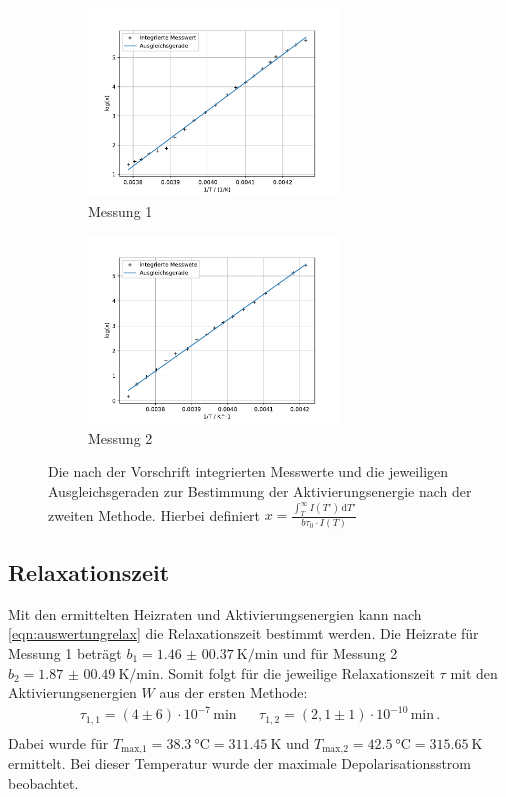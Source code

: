   \begin{figure}[H]
    \begin{subfigure}[b]{.5\linewidth}
      \centering
      \includegraphics[height=5cm, keepaspectratio]{build/log(int)_2durchT_1.pdf}
      \caption{Messung 1}
    \end{subfigure}
    \begin{subfigure}[b]{.5\linewidth}
      \centering
      \includegraphics[height=5cm, keepaspectratio]{build/log(int)_2durchT_2.pdf}
      \caption{Messung 2}
    \end{subfigure}
    \caption{Die nach der Vorschrift integrierten Messwerte und die jeweiligen Ausgleichsgeraden zur Bestimmung der Aktivierungsenergie nach der zweiten Methode.
      Hierbei definiert $x = \frac{\int_T^\infty I(T') \, \text{d}T'}{b \tau_0 \cdot I(T)}$}
    \label{fig:Trapez}
  \end{figure} %

\subsection{Relaxationszeit}
  Mit den ermittelten Heizraten und Aktivierungsenergien kann nach \eqref{eqn:auswertungrelax} die Relaxationszeit bestimmt werden.
  Die Heizrate für Messung 1 beträgt $b_1 = \SI{1.46(0037)}{\kelvin\per\minute}$ und für Messung 2 $b_2 = \SI{1.87(0049)}{\kelvin\per\minute}$.
  Somit folgt für die jeweilige Relaxationszeit $\tau$ mit den Aktivierungsenergien $W$ aus der ersten Methode:
  \begin{align*}
    \tau_{1,1} = (4\pm 6)\cdot 10^{-7}\,\si{\minute} &&  \tau_{1,2} = (2,1\pm 1)\cdot 10^{-10}\,\si{\minute} \, . \\
  \end{align*}
  Dabei wurde für $T_\text{max,1} = \SI{38.3}{\celsius} = \SI{311.45}{\kelvin} $ und $T_\text{max,2} = \SI{42.5}{\celsius} = \SI{315.65}{\kelvin}$ ermittelt.
  Bei dieser Temperatur wurde der maximale Depolarisationsstrom beobachtet.

